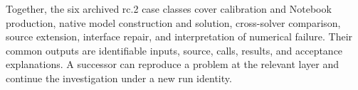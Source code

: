 \hypertarget{auto.05.p5}{}
Together, the six archived rc.2 case classes cover calibration and Notebook production, native model construction and solution, cross-solver comparison, source extension, interface repair, and interpretation of numerical failure. Their common outputs are identifiable inputs, source, calls, results, and acceptance explanations. A successor can reproduce a problem at the relevant layer and continue the investigation under a new run identity.
